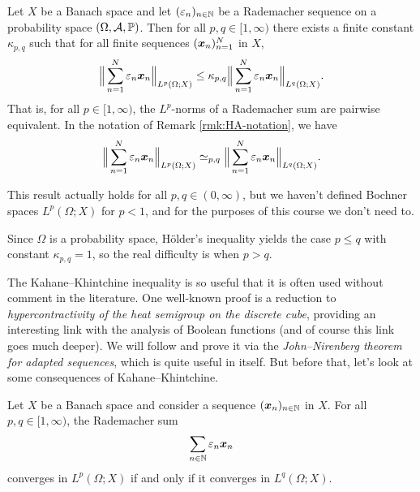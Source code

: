\begin{thm}\label{thm:kk}
  Let $X$ be a Banach space and let $(\varepsilon_{n})_{n \in \mathbb{N}}$ be a Rademacher sequence on a probability space $(\Omega,\mathcal{A},\mathbb{P})$.
  Then for all $p,q \in [1,\infty)$ there exists a finite constant $\kappa_{p,q}$ such that for all finite sequences $(\bm{x}_n)_{n=1}^N$ in $X$,
  \begin{equation*}
    \Big\|\sum_{n=1}^{N} \varepsilon_{n} \bm{x}_{n} \Big\|_{L^p(\Omega;X)} \leq \kappa_{p,q} \Big\|\sum_{n=1}^{N} \varepsilon_{n} \bm{x}_{n} \Big\|_{L^q(\Omega;X)}.
  \end{equation*}
  That is, for all $p \in [1,\infty)$, the $L^p$-norms of a Rademacher sum are pairwise equivalent.
  In the notation of Remark \ref{rmk:HA-notation}, we have
  \begin{equation*}
    \Big\|\sum_{n=1}^{N} \varepsilon_{n} \bm{x}_{n} \Big\|_{L^p(\Omega;X)} \simeq_{p,q} \Big\|\sum_{n=1}^{N} \varepsilon_{n} \bm{x}_{n} \Big\|_{L^q(\Omega;X)}.
  \end{equation*}
\end{thm}

\begin{rmk}
  This result actually holds for all $p,q \in (0,\infty)$, but we haven't defined Bochner spaces $L^p(\Omega;X)$ for $p < 1$, and for the purposes of this course we don't need to.
\end{rmk}

Since $\Omega$ is a probability space, H\"older's inequality yields the case $p \leq q$ with constant $\kappa_{p,q} = 1$, so the real difficulty is when $p > q$.

The Kahane--Khintchine inequality is so useful that it is often used without comment in the literature.
One well-known proof is a reduction to \emph{hypercontractivity of the heat semigroup on the discrete cube}, providing an interesting link with the analysis of Boolean functions (and of course this link goes much deeper).
We will follow \cite{HNVW16} and prove it via the \emph{John--Nirenberg theorem for adapted sequences}, which is quite useful in itself.
But before that, let's look at some consequences of Kahane--Khintchine.

\begin{prop}
  Let $X$ be a Banach space and consider a sequence $(\bm{x}_{n})_{n \in \mathbb{N}}$ in $X$.
  For all $p,q \in [1,\infty)$, the Rademacher sum
  \begin{equation}\label{eq:rad-sum-example}
    \sum_{n \in \mathbb{N}} \varepsilon_{n} \bm{x}_{n}
  \end{equation}
  converges in $L^p(\Omega;X)$ if and only if it converges in $L^q(\Omega;X)$.
\end{prop}

